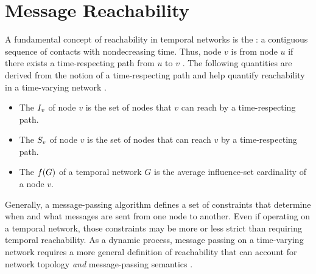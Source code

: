 %
%

\section{Message Reachability}\label{sec:reachability}
A fundamental concept of reachability in temporal networks is the : a contiguous sequence of contacts with nondecreasing time. Thus, node $v$ is  from node $u$ if there exists a time-respecting path from $u$ to $v$ \cite{Moody2002}. The following quantities are derived from the notion of a time-respecting path and help quantify reachability in a time-varying network \cite{Holme2012}.
%
\begin{itemize}
    \item The  $I_v$ of node $v$ is the set of nodes that $v$ can reach by a time-respecting path.
    \item The  $S_v$ of node $v$ is the set of nodes that can reach $v$ by a time-respecting path.
    \item The  $f(G)$ of a temporal network $G$ is the average influence-set cardinality of a node $v$.
\end{itemize}

Generally, a message-passing algorithm defines a set of constraints that determine when and what messages are sent from one node to another. Even if operating on a temporal network, those constraints may be more or less strict than requiring temporal reachability. As a dynamic process, message passing on a time-varying network requires a more general definition of reachability that can account for network topology \emph{and} message-passing semantics \cite{Barrat2013}.

